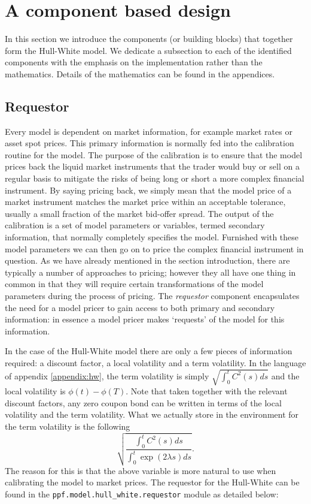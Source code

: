 \section{A component based design} 

In this section we introduce the components (or building blocks) that
together form the Hull-White model. We dedicate a subsection to each
of the identified components with the emphasis on the implementation
rather than the mathematics. Details of the mathematics can be found
in the appendices.

\subsection{Requestor} 

Every model is dependent on market information, for example market
rates or asset spot prices.  This primary information is normally fed
into the calibration routine for the model. The purpose of the
calibration is to ensure that the model prices back the liquid market
instruments that the trader would buy or sell on a regular basis to
mitigate the risks of being long or short a more complex financial
instrument. By saying pricing back, we simply mean that the model price 
of a market instrument matches the market price within an acceptable 
tolerance, usually a small fraction of the market bid-offer spread. 
The output of the calibration is a set of model parameters
or variables, termed secondary information, that normally completely
specifies the model. Furnished with these model parameters we can then
go on to price the complex financial instrument in question. As we
have already mentioned in the section introduction, there are
typically a number of approaches to pricing; however they all have one
thing in common in that they will require certain transformations of
the model parameters during the process of pricing. The
\emph{requestor} component encapsulates the need for a model pricer to
gain access to both primary and secondary information: in essence a
model pricer makes `requests' of the model for this information.

In the case of the Hull-White model there are only a few pieces of information required: a discount factor, a local volatility and a term 
volatility. In the language of appendix \ref{appendix:hw}, the term volatility is simply $\sqrt{\int_0^t C^2(s) ds}$ and the local volatility is 
$\phi(t)-\phi(T)$. Note that taken together with the relevant discount factors, any zero coupon bond can be written in terms of the local 
volatility and the term volatility. What we actually store in the environment for the term volatility is the following
\begin{equation}
\sqrt{\frac{\int_0^t C^2(s) ds}{\int_0^t \exp(2 \lambda s) ds}}.
\end{equation}
The reason for this is that the above variable is more natural to use when calibrating the model to market prices. The requestor for the Hull-White can be found in the \verb|ppf.model.hull_white.requestor| module as detailed below: 

